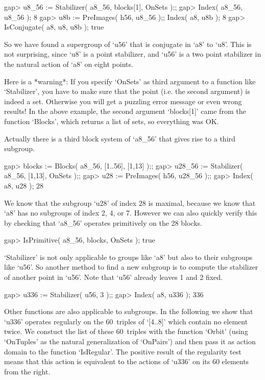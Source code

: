 \beginexample
gap> u8_56 := Stabilizer( a8_56, blocks[1], OnSets );;
gap> Index( a8_56, u8_56 );
8
gap> u8b := PreImages( h56, u8_56 );; Index( a8, u8b );
8
gap> IsConjugate( a8, u8, u8b );
true
\endexample

So we have found a supergroup of `u56' that is conjugate in `a8' to `u8'.
This is not surprising, since `u8' is a point stabilizer, and `u56' is a
two point stabilizer in the natural action of `a8' on eight points.

Here  is a *warning*:   If you specify `OnSets'  as  third argument  to a
function like  `Stabilizer', you have to  make sure that the  point (i.e.
the second argument) is  indeed a set. Otherwise you  will get a puzzling
error message or  even  wrong results! In  the above  example, the second
argument  `blocks[1]'  came from the  function  `Blocks', which returns a
list of sets, so everything was OK.

Actually there  is a third  block system of `a8_56'  that gives rise to a
third subgroup.

\beginexample
gap> blocks := Blocks( a8_56, [1..56], [1,13] );;
gap> u28_56 := Stabilizer( a8_56, [1,13], OnSets );;
gap> u28 := PreImages( h56, u28_56 );;
gap> Index( a8, u28 );
28
\endexample

We know that  the subgroup `u28' of index  28 is maximal, because we know
that  `a8' has no  subgroups  of index 2,  4,  or 7.  However we can also
quickly verify this by checking  that `a8_56' operates primitively on the
28 blocks.

\beginexample
gap> IsPrimitive( a8_56, blocks, OnSets );
true
\endexample

`Stabilizer' is not only applicable to groups like `a8' but also to their
subgroups like  `u56'. So another  method  to find  a  new subgroup is to
compute the stabilizer of another point in `u56'. Note that `u56' already
leaves 1 and 2 fixed.

\beginexample
gap> u336 := Stabilizer( u56, 3 );;
gap> Index( a8, u336 );
336
\endexample

Other  functions  are also applicable  to  subgroups. In the following we
show that  `u336' operates regularly on the  60~triples of `[4..8]' which
contain no element twice. We  constuct the list  of these 60~triples with
the function `Orbit' (using `OnTuples'  as the natural generalization  of
`OnPairs')  and   then  pass it   as  action domain  to   the function
`IsRegular'.  The positive result of  the regularity test means that this
action is equivalent  to the actions of `u336'  on  its 60 elements
from the right.


